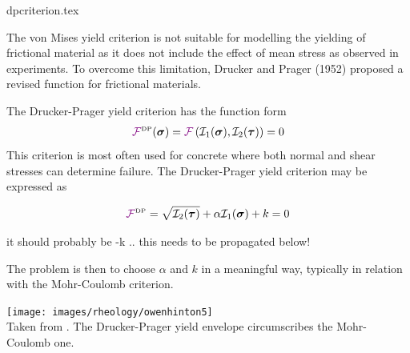 \begin{flushright} {\tiny {\color{gray} dpcriterion.tex}} \end{flushright}

The von Mises yield criterion is not suitable for modelling the yielding of frictional material 
as it does not include the effect of mean stress as observed in experiments. To overcome this 
limitation, Drucker and Prager (1952) \cite{drpr52} proposed a revised function for frictional materials.

The Drucker-Prager yield criterion has the function form
\begin{equation}
{\color{violet}\cal F}^{\text{\tiny DP}}({\bm \sigma})={\color{violet}\cal F} \left( {\cal I}_1({\bm \sigma}), {\cal I}_2({\bm \tau}) \right) = 0 
\end{equation}
This criterion is most often used for concrete where both normal and shear stresses 
can determine failure. The Drucker-Prager yield criterion may be expressed as
\begin{mdframed}[backgroundcolor=blue!5]
\begin{equation}
{\color{violet}\cal F}^{\text{\tiny DP}}= \sqrt{{\cal I}_2({\bm \tau})} + \alpha {\cal I}_1({\bm \sigma}) + k =0  
\label{dpcriterion} 
\end{equation}
\end{mdframed}

{\color{orange} it should probably be -k .. this needs to be propagated below!}

The problem is then to choose $\alpha$ and $k$ in a meaningful way, typically in relation with the 
Mohr-Coulomb criterion.

\begin{center}
\texttt{[image: images/rheology/owenhinton5]}\\
{\captionfont Taken from \textcite{owhi}. The Drucker-Prager yield envelope 
circumscribes the Mohr-Coulomb one.}
\end{center}

